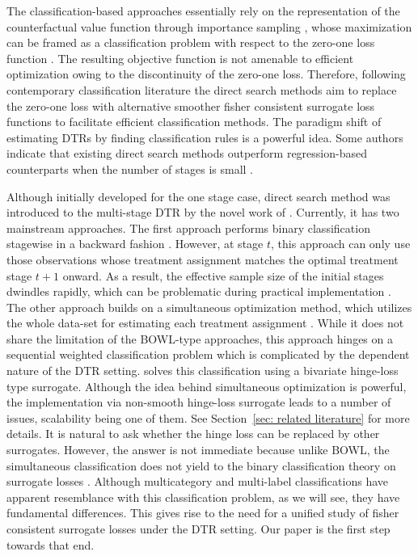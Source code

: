 \documentclass[preprint] {imsart}
\begin{document}
The classification-based approaches essentially rely
 on the representation of the counterfactual value function through importance sampling \citep{MurphySA2001MMMf}, whose maximization can be framed as a classification problem with respect to the zero-one loss function \citep[cf.][and the references therein]{zhao2012, zhao2015, chen2016personalized, zhou2017, song2015sparse, chen2017, cui2020semiparametric}. The resulting objective function is not amenable to efficient optimization  owing to the discontinuity of the zero-one loss. Therefore, following contemporary classification literature \citep[cf.][]{bartlett2006, lin2004note}  the  direct search methods aim to  replace the zero-one loss with alternative smoother fisher consistent surrogate loss functions to facilitate efficient classification methods.  The paradigm shift of estimating DTRs by finding classification rules is a powerful idea. Some authors indicate that existing  direct search methods  outperform regression-based counterparts  when the number of stages is small \citep{laber2019, luedtke2016}.
 
 
  Although initially developed for the one stage case, direct search method  was introduced to the  multi-stage DTR by the novel work of \cite{zhao2015}. 
 Currently, it has two mainstream approaches.  The first approach  performs binary classification stagewise   in a backward fashion  \citep[cf. BOWL method of ][]{zhao2015, jiang2019}. However, at stage $t$,  this approach can only use those observations whose treatment assignment matches the optimal treatment stage $t+1$ onward. As a result, the effective sample size of the initial stages dwindles rapidly, which can be problematic during practical implementation  \citep{laber2019, kallus2020comment}.  
 The other approach builds on a simultaneous optimization method, which utilizes the  whole data-set for estimating each treatment assignment \citep[simultaneous outcome weighted learning (SOWL),][]{zhao2015}. While it does not share the limitation of the BOWL-type approaches, this approach hinges on a sequential weighted classification problem which is complicated by the dependent nature of the DTR setting.  \cite{zhao2015}  solves this classification using a bivariate hinge-loss type surrogate. Although the idea behind simultaneous optimization is powerful,  the implementation via non-smooth hinge-loss surrogate leads to   a number of issues, scalability being one of them. See Section~\ref{sec: related literature} for more details.  
 It is natural to ask whether the hinge loss can be replaced by other surrogates. However, the answer is not immediate because unlike BOWL, the simultaneous classification does not yield to the  
binary classification theory on surrogate losses  \citep{bartlett2006}. Although multicategory and multi-label classifications have apparent resemblance with this  classification problem, as we will see, they have fundamental differences. This gives rise to the need for a unified study of fisher consistent surrogate losses under the DTR setting. Our paper is the first step towards that end.
  
\end{document}
